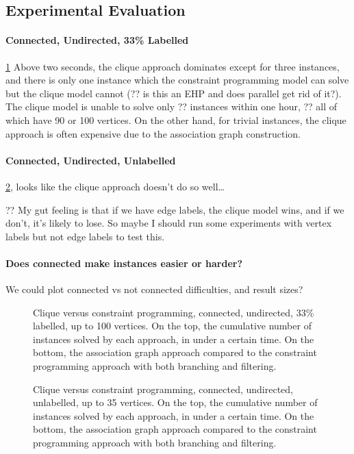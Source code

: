 \documentclass{llncs}
\begin{document}
\subsection{Experimental Evaluation}

\paragraph{Connected, Undirected, 33\% Labelled} \cref{figure:connected-undir33} Above two seconds,
    the clique approach dominates except for three instances, and there is only one instance which
    the constraint programming model can solve but the clique model cannot (?? is this an EHP and does parallel get rid
    of it?). The clique model is unable to solve only ??  instances within one hour, ?? all of which
    have 90 or 100 vertices.  On the other hand, for trivial instances, the clique approach is often
    expensive due to the association graph construction.

\paragraph{Connected, Undirected, Unlabelled} \cref{figure:connected-plain}, looks like the clique
approach doesn't do so well\ldots

?? My gut feeling is that if we have edge labels, the clique model wins, and if we don't, it's
likely to lose. So maybe I should run some experiments with vertex labels but not edge labels to
test this.

\paragraph{Does connected make instances easier or harder?} We could plot connected vs not connected
difficulties, and result sizes?

\begin{figure}[p]
    \centering
    
    \caption{Clique versus constraint programming, connected, undirected, 33\% labelled, up to 100 vertices. On the top,
        the cumulative number of instances solved by each approach, in under a certain time. On the
        bottom, the association graph approach compared to the constraint programming approach with
        both branching and filtering.} \label{figure:connected-undir33}
\end{figure}

\begin{figure}[p]
    \centering
    
    \caption{Clique versus constraint programming, connected, undirected, unlabelled, up to 35 vertices. On the top, the
        cumulative number of instances solved by each approach, in under a certain time. On the
        bottom, the association graph approach compared to the constraint programming approach
    with both branching and filtering.}
\label{figure:connected-plain}
\end{figure}
\end{document}
